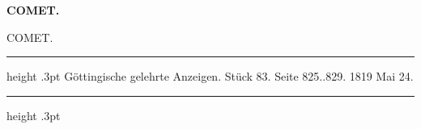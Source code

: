 \clearpage
\thispagestyle{empty}
\noindent{}%
%
\parbox[t]{\dimexpr\linewidth-24mm\relax}{\centering\footnotesize\bfseries COMET.\par}%
\makebox[12mm][r]{}\par\nobreak\medskip
\begin{center}
\Large COMET.
\end{center}
\begin{center}
\parbox{.77\linewidth}{%
\centering\small
\hrule height .3pt\relax\vspace{2.5pt}
Göttingische gelehrte Anzeigen. Stück 83. Seite 825..829. 1819 Mai 24.\par
\vspace{2.5pt}\hrule height .3pt\relax
}
\end{center}

